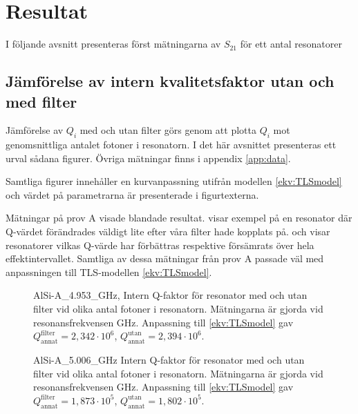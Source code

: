 \documentclass[main.tex]{subfiles}
\begin{document}
\chapter{Resultat}
\label{ch:results}
I följande avsnitt presenteras först mätningarna av $S_{21}$ för ett antal resonatorer

\section{Jämförelse av intern kvalitetsfaktor utan och med filter}
Jämförelse av $Q_i$ med och utan filter görs genom att plotta $Q_i$ mot genomsnittliga antalet fotoner i resonatorn. I det här avsnittet presenteras ett urval sådana figurer. Övriga mätningar finns i appendix \ref{app:data}.

Samtliga figurer innehåller en kurvanpassning utifrån modellen \ref{ekv:TLSmodel} och värdet på parametrarna är presenterade i figurtexterna.

Mätningar på prov A visade blandade resultat.  visar exempel på en resonator där Q-värdet förändrades väldigt lite efter våra filter hade kopplats på.  och  visar resonatorer vilkas Q-värde har förbättras respektive försämrats över hela effektintervallet. Samtliga av dessa mätningar från prov A passade väl med anpassningen till TLS-modellen \ref{ekv:TLSmodel}.


\begin{figure}[H]
  \centering
  \setlength{}
  \setlength\figureheight{15em}
  
  \caption{AlSi-A\_4.953\_GHz, Intern Q-faktor för resonator med och utan filter vid olika antal fotoner i resonatorn. Mätningarna är gjorda vid resonansfrekvensen \unit[4,953]{GHz}. Anpassning till \ref{ekv:TLSmodel} gav $Q_{\text{annat}}^{\text{filter}}=2,342\cdot10^6$, $Q_{\text{annat}}^{\text{utan}}=2,394\cdot10^6$.} 
  \label{fig:A4.953}
\end{figure}

\begin{figure}[H]
  \centering
  \setlength{}
  \setlength\figureheight{15em}
  
  \caption{AlSi-A\_5.006\_GHz Intern Q-faktor för resonator med och utan filter vid olika antal fotoner i resonatorn. Mätningarna är gjorda vid resonansfrekvensen \unit[4,953]{GHz}. Anpassning till \ref{ekv:TLSmodel} gav $Q_{\text{annat}}^{\text{filter}}=1,873\cdot10^5$, $Q_{\text{annat}}^{\text{utan}}=1,802\cdot10^5$.}
  \label{fig:A5.006}
\end{figure}
\end{document}
